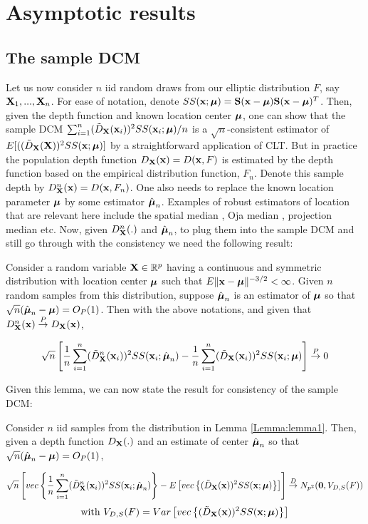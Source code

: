 \documentclass[fleqn,11pt]{article}
\begin{document}
\section{Asymptotic results}
\subsection{The sample DCM}
Let us now consider $n$ iid random draws from our elliptic distribution $F$, say ${\mathbf{X}}_1,...,{\mathbf{X}}_n$. For ease of notation, denote $SS({\bf{x}}; {\boldsymbol{\mu}}) = {\mathbf{S}}({\bf{x}} - {\boldsymbol{\mu}}) {\mathbf{S}}({\bf{x}} - {\boldsymbol{\mu}})^T$. Then, given the depth function and known location center ${\boldsymbol{\mu}}$, one can show that the sample DCM $\sum_{i=1}^n (\tilde D_{\mathbf{X}}({\bf{x}}_i))^2SS({\bf{x}}_i; {\boldsymbol{\mu}}) /n$ is a $\sqrt n$-consistent estimator of $E[( (\tilde D_{\mathbf{X}} ({\mathbf{X}}))^2 SS({\bf{x}}; {\boldsymbol{\mu}})]$ by a straightforward application of CLT. But in practice the population depth function $D_{\mathbf{X}}({\bf{x}}) = D({\bf{x}}, F)$ is estimated by the depth function based on the empirical distribution function, $F_n$. Denote this sample depth by $D^n_{\mathbf{X}} ({\bf{x}}) = D({\bf{x}}, F_n)$. One also needs to replace the known location parameter ${\boldsymbol{\mu}}$ by some estimator $\hat{{\boldsymbol{\mu}}}_n$. Examples of robust estimators of location that are relevant here include the spatial median \citep{haldane48,brown83}, Oja median \citep{oja83}, projection median \citep{zuo03} etc. Now, given $D^n_{\mathbf{X}}(.)$ and $\hat {{\boldsymbol{\mu}}}_n$, to plug them into the sample DCM and still go through with the consistency we need the following result:

\begin{Lemma} \label{Lemma:lemma1}
Consider a random variable ${\mathbf{X}} \in \mathbb{R}^p$ having a continuous and symmetric distribution with location center ${\boldsymbol{\mu}}$ such that $E\|{\bf{x}} - {\boldsymbol{\mu}} \|^{-3/2} < \infty$. Given $n$ random samples from this distribution, suppose $\hat{{\boldsymbol{\mu}}}_n$ is an estimator of ${\boldsymbol{\mu}}$ so that $\sqrt n (\hat{{\boldsymbol{\mu}}}_n - {\boldsymbol{\mu}}) = O_P(1) $. Then with the above notations, and given that $D^n_{\mathbf{X}} ({\bf{x}}) \stackrel{P}{\rightarrow} D_{\mathbf{X}} ({\bf{x}})$,

$$ \sqrt n \left[
\frac{1}{n} \sum_{i=1}^n (\tilde D^n_{\mathbf{X}} ({\bf{x}}_i))^2 SS({\bf{x}}_i; \hat{{\boldsymbol{\mu}}}_n) -
\frac{1}{n} \sum_{i=1}^n (\tilde D_{\mathbf{X}} ({\bf{x}}_i))^2 SS({\bf{x}}_i; {\boldsymbol{\mu}}) \right]
\stackrel{P}{\rightarrow} 0 $$
\end{Lemma}

Given this lemma, we can now state the result for consistency of the sample DCM:

\begin{Theorem} \label{Theorem:rootn}
Consider $n$ iid samples from the distribution in Lemma \ref{Lemma:lemma1}. Then, given a depth function $D_{\mathbf{X}}(.)$ and an estimate of center $\hat{{\boldsymbol{\mu}}}_n$ so that $\sqrt n(\hat {{\boldsymbol{\mu}}}_n - {\boldsymbol{\mu}}) = O_P(1)$,

$$ \sqrt n \left[ vec\left\{ \frac{1}{n} \sum_{i=1}^n (\tilde D^n_{\mathbf{X}} ({\bf{x}}_i))^2 SS({\bf{x}}_i; \hat{{\boldsymbol{\mu}}}_n) \right\} - E \left[ vec\left\{ (\tilde D_{\mathbf{X}} ({\bf{x}}))^2 SS({\bf{x}}; {\boldsymbol{\mu}}) \right\} \right] \right]
\stackrel{D}{\rightarrow}
N_{p^2} ({\bf 0}, V_{D,S}(F)) $$
$$ \text{with } V_{D,S}(F) = Var \left[vec \left\{ (\tilde D_{\mathbf{X}} ({\bf{x}}))^2 SS({\bf{x}}; {\boldsymbol{\mu}}) \right\} \right] $$
\end{Theorem}
\end{document}
